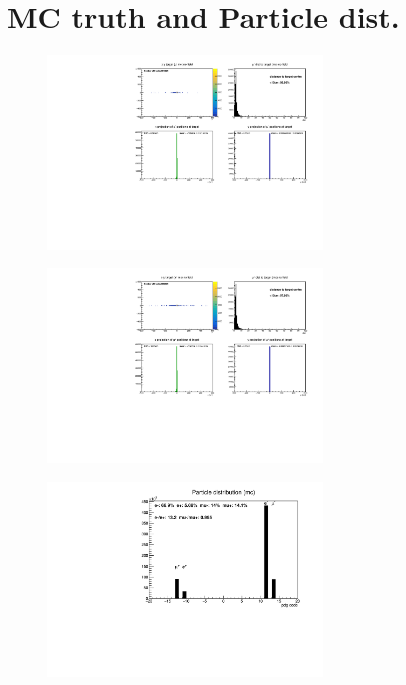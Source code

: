 \section{MC truth and Particle dist.}

\begin{frame}[t]{}
  \begin{figure}
    \centering
    \includegraphics[width=0.65\textwidth]{../hists/nofield/p/mc_target_dist_mu.pdf}
  \end{figure}
\end{frame}



\begin{frame}[t]{}
  \begin{figure}
    \centering
    \includegraphics[width=0.65\textwidth]{../hists/nofield/p/mc_target_dist_amu.pdf}
  \end{figure}
\end{frame}

\begin{frame}[t]{}
  \begin{figure}
    \centering
    \includegraphics[width=0.65\textwidth]{../hists/nofield/allP/mc_pdg.pdf}
  \end{figure}
\end{frame}

